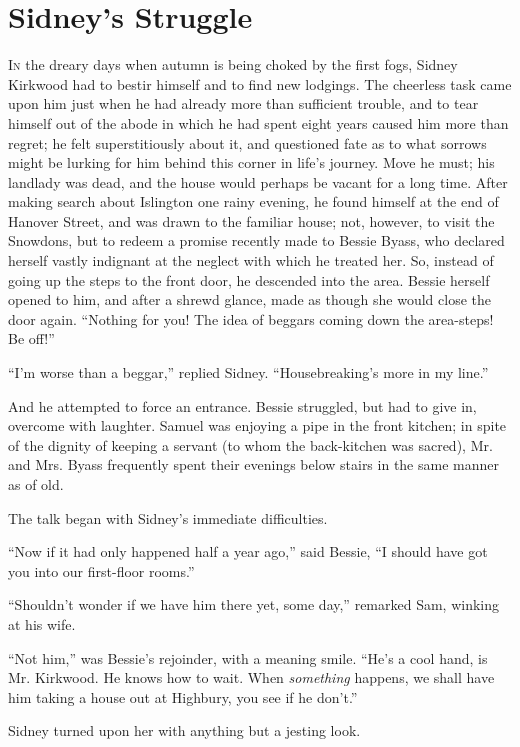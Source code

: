 \chapter{Sidney's Struggle}

\textsc{In} the dreary days when autumn is being choked by the first
fogs, Sidney Kirkwood had to bestir himself and to find new lodgings.
The cheerless task came upon him just when he had already more than
sufficient trouble, and to tear himself out of the abode in which he had
spent eight years caused him more than regret; he felt superstitiously
about it, and questioned fate as to what sorrows might be lurking for
him behind this corner in life's journey. Move he must; his landlady was
dead, and the house would perhaps be vacant for a long time. After
making search about Islington one rainy evening, he found himself at the
end of Hanover Street, and was drawn to the familiar house; not,
however, to visit the {\protect\hypertarget{267}{}{}}Snowdons, but to
redeem a promise recently made to Bessie Byass, who declared herself
vastly indignant at the neglect with which he treated her. So, instead
of going up the steps to the front door, he descended into the area.
Bessie herself opened to him, and after a shrewd glance, made as though
she would close the door again. ``Nothing for you! The idea of beggars
coming down the area-steps! Be off!''

``I'm worse than a beggar,'' replied Sidney. ``Housebreaking's more in
my line.''

And he attempted to force an entrance. Bessie struggled, but had to give
in, overcome with laughter. Samuel was enjoying a pipe in the front
kitchen; in spite of the dignity of keeping a servant (to whom the
back-kitchen was sacred), Mr. and Mrs. Byass frequently spent their
evenings below stairs in the same manner as of old.

The talk began with Sidney's immediate difficulties.

``Now if it had only happened half a year ago,'' said Bessie, ``I should
have got you into our first-floor rooms.''

{\protect\hypertarget{268}{}{}}``Shouldn't wonder if we have him there
yet, some day,'' remarked Sam, winking at his wife.

``Not him,'' was Bessie's rejoinder, with a meaning smile. ``He's a cool
hand, is Mr. Kirkwood. He knows how to wait. When \emph{something}
happens, we shall have him taking a house out at Highbury, you see if he
don't.''

Sidney turned upon her with anything but a jesting look.

